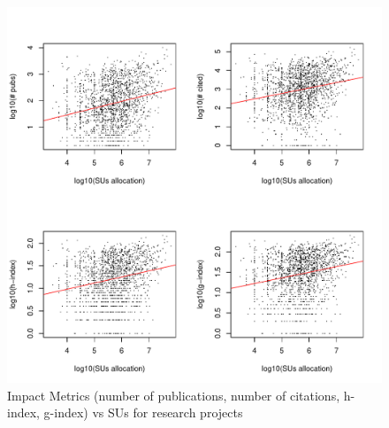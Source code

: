 \documentclass{sig-alternate}
\begin{document}
\begin{figure}[!htb] 
  \centering 
    \includegraphics[width=1.0\columnwidth]{images/02_metrics_vs_alloc_research_proj.pdf} 
  \caption{Impact Metrics (number of publications, number of citations, h-index, g-index) vs SUs for research projects}\label{F:metrics-vs-alloc-research-proj} 
\end{figure} 
 
 
 
\end{document}
